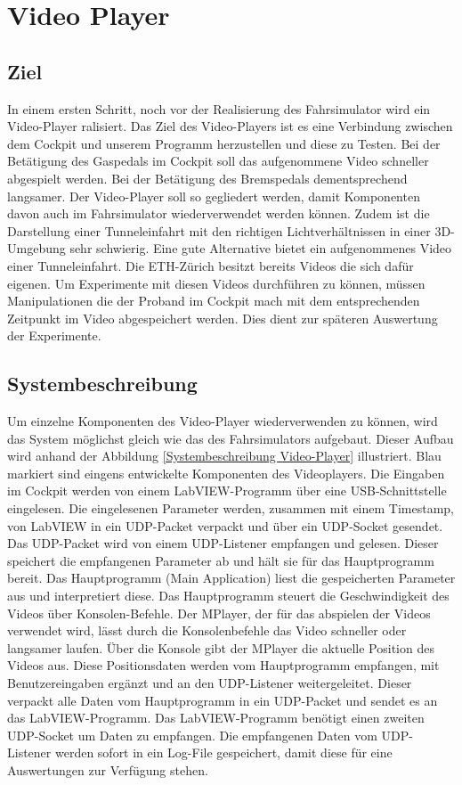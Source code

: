 \section{Video Player}
\subsection{Ziel}
In einem ersten Schritt, noch vor der Realisierung des Fahrsimulator wird ein Video-Player ralisiert. Das Ziel des Video-Players ist es eine Verbindung zwischen dem Cockpit und unserem Programm herzustellen und diese zu Testen. Bei der Betätigung des Gaspedals im Cockpit soll das aufgenommene Video schneller abgespielt werden. Bei der Betätigung des Bremspedals dementsprechend langsamer. Der Video-Player soll so gegliedert werden, damit Komponenten davon auch im Fahrsimulator wiederverwendet werden können. Zudem ist die Darstellung einer Tunneleinfahrt mit den richtigen Lichtverhältnissen in einer 3D-Umgebung sehr schwierig. Eine gute Alternative bietet ein aufgenommenes Video einer Tunneleinfahrt. Die ETH-Zürich besitzt bereits Videos die sich dafür eigenen. Um Experimente mit diesen Videos durchführen zu können, müssen Manipulationen die der Proband im Cockpit mach mit dem entsprechenden Zeitpunkt im Video abgespeichert werden. Dies dient zur späteren Auswertung der Experimente. 
\\
\subsection{Systembeschreibung}

Um einzelne Komponenten des Video-Player wiederverwenden zu können, wird das System möglichst gleich wie das des Fahrsimulators aufgebaut. Dieser Aufbau wird anhand der Abbildung \ref{Systembeschreibung Video-Player} illustriert. Blau markiert sind eingens entwickelte Komponenten des Videoplayers. Die Eingaben im Cockpit werden von einem LabVIEW-Programm über eine USB-Schnittstelle eingelesen. Die eingelesenen Parameter werden, zusammen mit einem Timestamp, von LabVIEW in ein UDP-Packet verpackt und über ein UDP-Socket gesendet. Das UDP-Packet wird von einem UDP-Listener empfangen und gelesen. Dieser speichert die empfangenen Parameter ab und hält sie für das Hauptprogramm bereit. Das Hauptprogramm (Main Application) liest die gespeicherten Parameter aus und interpretiert diese. Das Hauptprogramm steuert die Geschwindigkeit des Videos über Konsolen-Befehle. Der MPlayer, der für das abspielen der Videos verwendet wird, lässt durch die Konsolenbefehle das Video schneller oder langsamer laufen. Über die Konsole gibt der MPlayer die aktuelle Position des Videos aus. Diese Positionsdaten werden vom Hauptprogramm empfangen, mit Benutzereingaben ergänzt und an den UDP-Listener weitergeleitet. Dieser verpackt alle Daten vom Hauptprogramm in ein UDP-Packet und sendet es an das LabVIEW-Programm. Das LabVIEW-Programm benötigt einen zweiten UDP-Socket um Daten zu empfangen. Die empfangenen Daten vom UDP-Listener werden sofort in ein Log-File gespeichert, damit diese für eine Auswertungen zur Verfügung stehen.
\newpage

